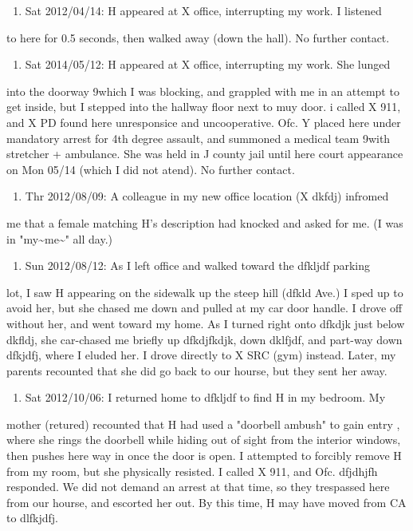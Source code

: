 \documentclass[12pt]{book}
\begin{document}
\begin{enumerate}
\item Sat 2012/04/14: H appeared at X office, interrupting my work. I listened
\end{enumerate}
to here for 0.5 seconds, then walked away (down the hall). No further 
contact.

\begin{enumerate}
\item Sat 2014/05/12: H appeared at X office, interrupting my work. She lunged
\end{enumerate}
into the doorway 9which I was blocking, and grappled with me in an attempt 
to get inside, but I stepped into the hallway floor next to muy door. i 
called X 911, and X PD found here unresponsice and uncooperative. Ofc. Y 
placed here under mandatory arrest for 4th degree assault, and summoned a 
medical team 9with stretcher + ambulance. She was held in J county jail 
until here court appearance on Mon 05/14 (which I did not atend). No further
contact.

\begin{enumerate}
\item Thr 2012/08/09: A colleague in my new office location (X dkfdj) infromed
\end{enumerate}
me that a female matching H's description had knocked and asked for me. (I 
was in "my\textasciitilde{}me\textasciitilde{}" all day.)

\begin{enumerate}
\item Sun 2012/08/12: As I left office and walked toward the dfkljdf parking
\end{enumerate}
lot, I saw H appearing on the sidewalk up the steep hill (dfkld Ave.) I sped
up to avoid her, but she chased me down and pulled at my car door handle. I
drove off without her, and went toward my home. As I turned right onto 
dfkdjk just below dkfldj, she car-chased me briefly up dfkdjfkdjk, down 
dklfjdf, and part-way down dfkjdfj, where I eluded her. I drove directly to 
X SRC (gym) instead. Later, my parents recounted that she did go back to our
hourse, but they sent her away. 

\begin{enumerate}
\item Sat 2012/10/06: I returned home to dfkljdf to find H in my bedroom. My
\end{enumerate}
mother (retured) recounted that H had used a "doorbell ambush" to gain entry
, where she rings the doorbell while hiding out of sight from the interior 
windows, then pushes here way in once the door is open. I attempted to 
forcibly remove H from my room, but she physically resisted. I called X 911,
and Ofc. dfjdhjfh responded. We did not demand an arrest at that time, so 
they trespassed here from our hourse, and escorted her out. By this time, H 
may have moved from CA to dlfkjdfj. 
\end{document}

